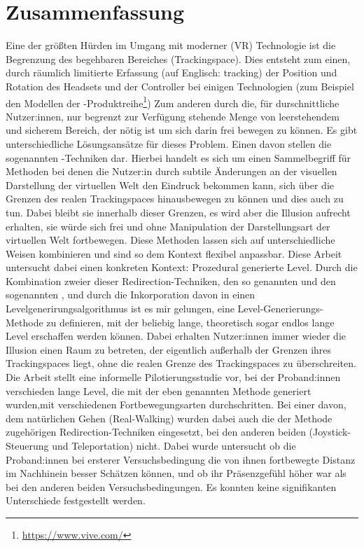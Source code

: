 \chapter*{Zusammenfassung}
Eine der größten Hürden im Umgang mit moderner  (VR) Technologie ist die Begrenzung des begehbaren Bereiches (Trackingspace).
Dies entsteht zum einen, durch räumlich limitierte Erfassung (auf Englisch: tracking) der Position und Rotation des Headsets und der Controller bei einigen Technologien (zum Beispiel den Modellen der -Produktreihe\footnote{\href{https://www.vive.com/}{https://www.vive.com/}})
Zum anderen durch die, für durschnittliche Nutzer:innen, nur begrenzt zur Verfügung stehende Menge von leerstehendem und sicherem Bereich, der nötig ist um sich darin frei bewegen zu können.
Es gibt unterschiedliche Lösungsansätze für dieses Problem.
Einen davon stellen die sogenannten -Techniken dar.
Hierbei handelt es sich um einen Sammelbegriff für Methoden bei denen die Nutzer:in durch subtile Änderungen an der visuellen Darstellung der virtuellen Welt den Eindruck bekommen kann, sich über die Grenzen des realen Trackingspaces hinausbewegen zu können und dies auch zu tun. Dabei bleibt sie innerhalb dieser Grenzen, es wird aber die Illusion aufrecht erhalten, sie würde sich frei und ohne Manipulation der Darstellungsart der virtuellen Welt fortbewegen. Diese Methoden lassen sich auf unterschiedliche Weisen kombinieren und sind so dem Kontext flexibel anpassbar.
Diese Arbeit untersucht dabei einen konkreten Kontext: Prozedural generierte Level. Durch die Kombination zweier dieser Redirection-Techniken, den so genannten  und den sogenannten , und durch die Inkorporation davon in einen Levelgenerirungsalgorithmus ist es mir gelungen, eine Level-Generierungs-Methode zu definieren, mit der beliebig lange, theoretisch sogar endlos lange Level erschaffen werden können. Dabei erhalten Nutzer:innen immer wieder die Illusion einen Raum zu betreten, der eigentlich außerhalb der Grenzen ihres Trackingspaces liegt, ohne die realen Grenze des Trackingspaces zu überschreiten.
Die Arbeit stellt eine informelle Pilotierungsstudie vor, bei der Proband:innen verschieden lange Level, die mit der eben genannten Methode generiert wurden,mit verschiedenen Fortbewegungsarten durchschritten. Bei einer davon, dem natürlichen Gehen (Real-Walking) wurden dabei auch die der Methode zugehörigen Redirection-Techniken eingesetzt, bei den anderen beiden (Joystick-Steuerung und Teleportation) nicht. Dabei wurde untersucht ob die Proband:innen bei ersterer Versuchsbedingung die von ihnen fortbewegte Distanz im Nachhinein besser Schätzen können, und ob ihr Präsenzgefühl höher war als bei den anderen beiden Versuchsbedingungen. Es konnten keine signifikanten Unterschiede festgestellt werden.

